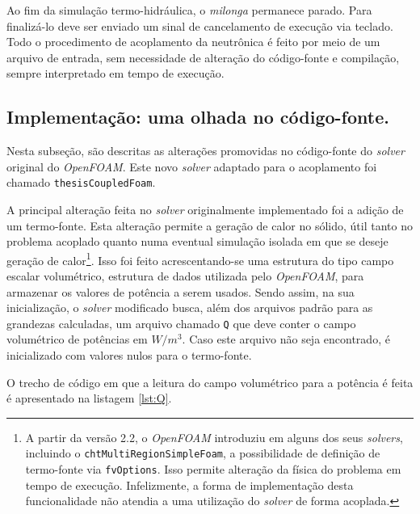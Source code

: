 Ao fim da simulação termo-hidráulica, o \textit{milonga} permanece parado. Para finalizá-lo deve ser enviado um sinal de
cancelamento de execução via teclado. Todo o procedimento de acoplamento da neutrônica é feito por meio de um arquivo
de entrada, sem necessidade de alteração do código-fonte e compilação, sempre interpretado em tempo de execução.

\subsection{Implementação: uma olhada no código-fonte.}
\label{subsec:detth}
Nesta subseção, são
descritas as alterações promovidas no código-fonte do \textit{solver} original do \textit{OpenFOAM}.
Este novo \textit{solver} adaptado para o acoplamento foi chamado \texttt{thesisCoupledFoam}.

A principal alteração feita no \textit{solver} originalmente implementado foi a adição de um termo-fonte.
Esta alteração permite a geração de calor no sólido, útil tanto no problema acoplado
quanto numa eventual simulação isolada em que se deseje geração de
calor\footnote{A partir da versão 2.2, o \textit{OpenFOAM} introduziu em alguns dos seus
\textit{solvers}, incluindo o \texttt{chtMultiRegionSimpleFoam}, a possibilidade de definição
de termo-fonte via \texttt{fvOptions}. Isso permite alteração da física do problema em
tempo de execução. Infelizmente, a forma de implementação desta funcionalidade não atendia a uma
utilização do \textit{solver} de forma acoplada.}. Isso foi feito acrescentando-se uma estrutura
do tipo campo escalar volumétrico, estrutura de dados utilizada pelo \textit{OpenFOAM},
para armazenar os valores de potência a serem usados. Sendo assim, na sua inicialização,
o \textit{solver} modificado busca, além dos arquivos padrão para as grandezas calculadas, um
arquivo chamado \texttt{Q} que deve conter o campo volumétrico de potências em $W/m^3$. Caso
este arquivo não seja encontrado, é inicializado com valores nulos para o termo-fonte.

O trecho de código em que a leitura do campo volumétrico para a potência é feita
é apresentado na listagem \ref{lst:Q}.

